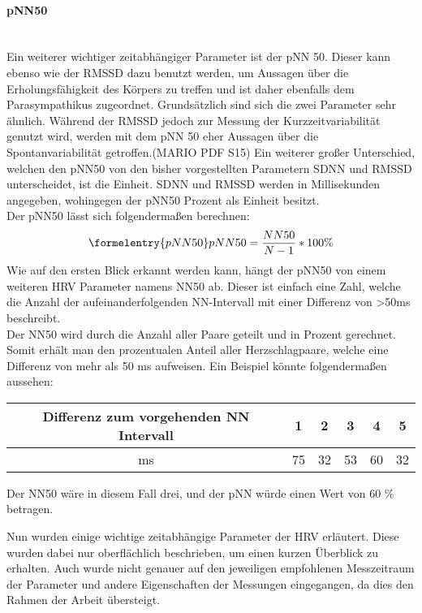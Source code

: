 \paragraph{pNN50}\mbox{} \\
Ein weiterer wichtiger zeitabhängiger Parameter ist der pNN 50. Dieser kann ebenso wie der RMSSD dazu benutzt werden, um Aussagen über die Erholungsfähigkeit des Körpers zu treffen und ist daher ebenfalls dem Parasympathikus zugeordnet. Grundsätzlich sind sich die zwei Parameter sehr ähnlich.
Während der RMSSD jedoch zur Messung der Kurzzeitvariabilität genutzt wird, werden mit dem pNN 50 eher Aussagen über die Spontanvariabilität getroffen.(MARIO PDF S15) 
Ein weiterer großer Unterschied, welchen den pNN50 von den bisher vorgestellten Parametern SDNN und RMSSD unterscheidet, ist die Einheit. SDNN und RMSSD werden in Millisekunden angegeben, wohingegen der pNN50 Prozent als Einheit besitzt. \\

Der pNN50 lässt sich folgendermaßen berechnen:
\begin{equation}\formelentry{pNN50}
	pNN50 =\dfrac{NN50}{N-1} * 100\%
\end{equation}
Wie auf den ersten Blick erkannt werden kann, hängt der pNN50 von einem weiteren HRV Parameter namens NN50 ab. Dieser ist einfach eine Zahl, welche die Anzahl der aufeinanderfolgenden NN-Intervall mit einer Differenz von >50ms beschreibt.\\
Der NN50 wird durch die Anzahl aller Paare geteilt und in Prozent gerechnet. Somit erhält man den prozentualen Anteil aller\color{red} Herzschlagpaare,  welche eine Differenz von mehr als 50 ms aufweisen. Ein Beispiel könnte folgendermaßen aussehen: \\

\begin{tabular}[h]{c|c|c|c|c|c}
Differenz zum vorgehenden NN Intervall & 1 & 2 & 3 & 4 & 5 \\
\hline
ms & 75 & 32 & 53 & 60 & 32 \\
\end{tabular}

Der NN50 wäre in diesem Fall drei, und der pNN würde einen Wert von 60 \% betragen.


Nun wurden einige wichtige zeitabhängige Parameter der HRV erläutert. Diese wurden dabei nur oberflächlich beschrieben, um einen kurzen Überblick zu erhalten. Auch wurde nicht genauer auf den jeweiligen empfohlenen Messzeitraum der Parameter und andere Eigenschaften der Messungen eingegangen, da dies den Rahmen der Arbeit übersteigt. 
 
